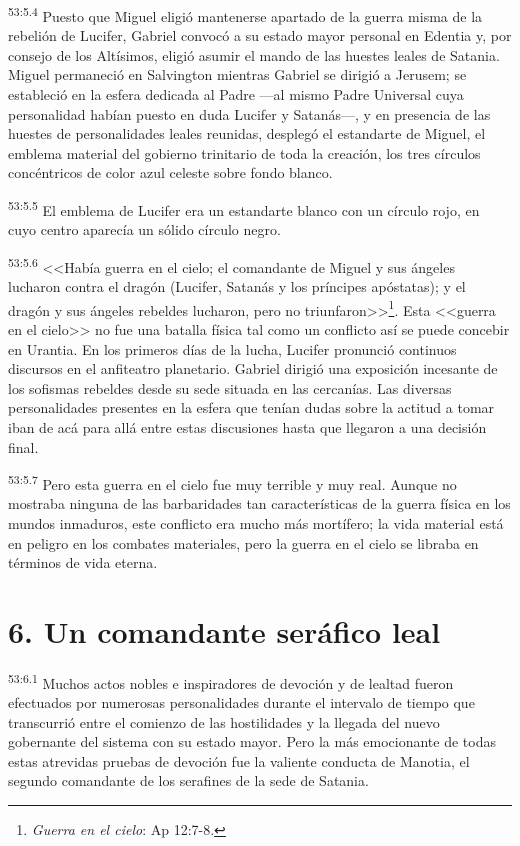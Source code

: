 \par
\textsuperscript{53:5.4} Puesto que Miguel eligió mantenerse apartado de la guerra misma de la rebelión de Lucifer, Gabriel convocó a su estado mayor personal en Edentia y, por consejo de los Altísimos, eligió asumir el mando de las huestes leales de Satania. Miguel permaneció en Salvington mientras Gabriel se dirigió a Jerusem; se estableció en la esfera dedicada al Padre ---al mismo Padre Universal cuya personalidad habían puesto en duda Lucifer y Satanás---, y en presencia de las huestes de personalidades leales reunidas, desplegó el estandarte de Miguel, el emblema material del gobierno trinitario de toda la creación, los tres círculos concéntricos de color azul celeste sobre fondo blanco.

\par
\textsuperscript{53:5.5} El emblema de Lucifer era un estandarte blanco con un círculo rojo, en cuyo centro aparecía un sólido círculo negro.

\par
\textsuperscript{53:5.6} <<Había guerra en el cielo; el comandante de Miguel y sus ángeles lucharon contra el dragón (Lucifer, Satanás y los príncipes apóstatas); y el dragón y sus ángeles rebeldes lucharon, pero no triunfaron>>\footnote{\textit{Guerra en el cielo}: Ap 12:7-8.}. Esta <<guerra en el cielo>> no fue una batalla física tal como un conflicto así se puede concebir en Urantia. En los primeros días de la lucha, Lucifer pronunció continuos discursos en el anfiteatro planetario. Gabriel dirigió una exposición incesante de los sofismas rebeldes desde su sede situada en las cercanías. Las diversas personalidades presentes en la esfera que tenían dudas sobre la actitud a tomar iban de acá para allá entre estas discusiones hasta que llegaron a una decisión final.

\par
\textsuperscript{53:5.7} Pero esta guerra en el cielo fue muy terrible y muy real. Aunque no mostraba ninguna de las barbaridades tan características de la guerra física en los mundos inmaduros, este conflicto era mucho más mortífero; la vida material está en peligro en los combates materiales, pero la guerra en el cielo se libraba en términos de vida eterna.

\section*{6. Un comandante seráfico leal}
\par
\textsuperscript{53:6.1} Muchos actos nobles e inspiradores de devoción y de lealtad fueron efectuados por numerosas personalidades durante el intervalo de tiempo que transcurrió entre el comienzo de las hostilidades y la llegada del nuevo gobernante del sistema con su estado mayor. Pero la más emocionante de todas estas atrevidas pruebas de devoción fue la valiente conducta de Manotia, el segundo comandante de los serafines de la sede de Satania.

